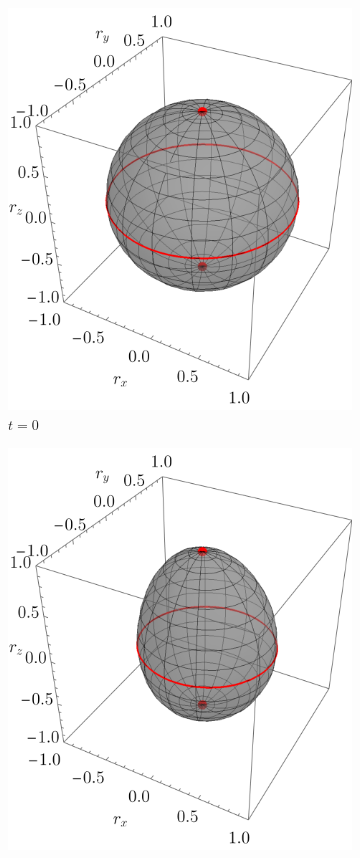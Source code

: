   \begin{figure}[ht!]
    \centering
    \begin{subfigure}{0.32\textwidth}
      \centering
      \includegraphics[width=0.9\linewidth]{chapter3/figures_toy/CNOT_p=0.5_t=0._r=0.9.png}
      \caption{$t=0$}
    \end{subfigure}%
    \begin{subfigure}{0.32\textwidth}
      \centering
      \includegraphics[width=0.9\linewidth]{chapter3/figures_toy/CNOT_p=0.9_t=0.5_r=0.9.png}

\end{subfigure}
\end{figure}
